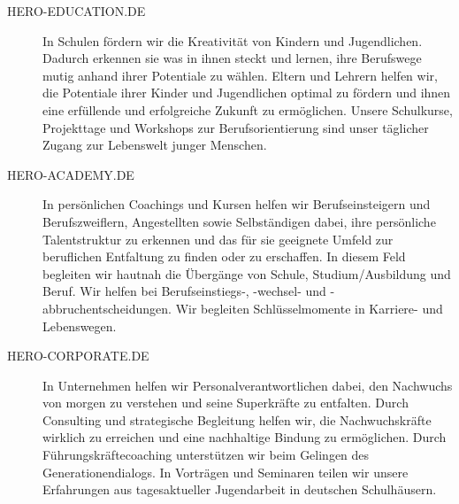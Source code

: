 \begin{description}
	\item[HERO-EDUCATION.DE] \glqq{}In Schulen fördern wir die Kreativität von Kindern und Jugendlichen. Dadurch erkennen sie was in ihnen steckt und lernen, ihre Berufswege mutig anhand ihrer Potentiale zu wählen. Eltern und Lehrern helfen wir, die Potentiale ihrer Kinder und Jugendlichen optimal zu fördern und ihnen eine erfüllende  und erfolgreiche Zukunft zu ermöglichen. Unsere Schulkurse, Projekttage und Workshops zur Berufsorientierung sind unser täglicher Zugang zur Lebenswelt junger Menschen.\grqq{} \parencite{hero-society}
	
	\item[HERO-ACADEMY.DE] \glqq{}In persönlichen Coachings und Kursen helfen wir Berufseinsteigern und Berufszweiflern, Angestellten sowie Selbständigen dabei, ihre persönliche Talentstruktur zu erkennen und das für sie geeignete Umfeld zur beruflichen Entfaltung zu finden oder zu erschaffen. In diesem Feld begleiten wir hautnah die Übergänge von Schule, Studium/Ausbildung und Beruf. Wir helfen bei Berufseinstiegs-, -wechsel- und -abbruchentscheidungen. Wir begleiten Schlüsselmomente in Karriere- und Lebenswegen.\grqq{} \parencite{hero-society}
	
	\item[HERO-CORPORATE.DE] \glqq{}In Unternehmen helfen wir Personalverantwortlichen dabei, den Nachwuchs von morgen zu verstehen und seine Superkräfte zu entfalten. Durch Consulting und strategische Begleitung helfen wir, die Nachwuchskräfte wirklich zu erreichen und eine nachhaltige Bindung zu ermöglichen. Durch Führungskräftecoaching unterstützen wir beim Gelingen des Generationendialogs. In Vorträgen und Seminaren teilen wir unsere Erfahrungen aus tagesaktueller Jugendarbeit in deutschen Schulhäusern.\grqq{}  \parencite{hero-society}
\end{description}

